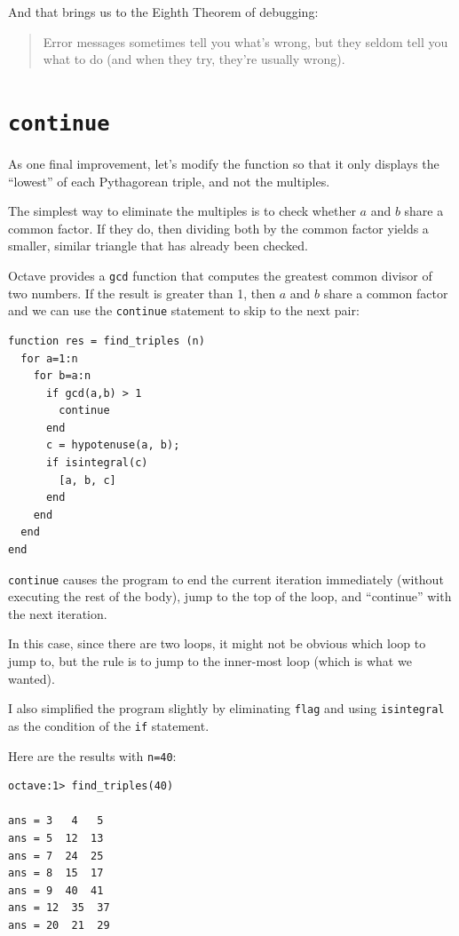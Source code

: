 \documentclass{book}
\begin{document}
And that brings us to the Eighth Theorem of debugging:

\begin{quote}
Error messages sometimes tell you what's wrong, but they
seldom tell you what to do (and when they try, they're usually
wrong).
\end{quote}


\section{{\tt continue}}

As one final improvement, let's modify the function so that it only
displays the ``lowest'' of each Pythagorean triple, and not the
multiples.

The simplest way to eliminate the multiples is to check whether
$a$ and $b$ share a common factor. If they do, then dividing both
by the common factor yields a smaller, similar triangle that has
already been checked.

Octave provides a {\tt gcd} function that computes the greatest common
divisor of two numbers. If the result is greater than 1, then
$a$ and $b$ share a common factor and we can use the {\tt continue}
statement to skip to the next pair:

\begin{verbatim}
function res = find_triples (n)
  for a=1:n
    for b=a:n
      if gcd(a,b) > 1
        continue
      end
      c = hypotenuse(a, b);
      if isintegral(c)
        [a, b, c]
      end
    end
  end
end
\end{verbatim}

{\tt continue} causes the program to end the current iteration
immediately (without executing the rest of the body), jump to
the top of the loop, and ``continue'' with the next iteration.

In this case, since there are two loops, it might not be obvious
which loop to jump to, but the rule is to jump to the inner-most
loop (which is what we wanted).

I also simplified the program slightly by eliminating
{\tt flag} and using {\tt isintegral} as the condition of the
{\tt if} statement.

Here are the results with {\tt n=40}:

\begin{verbatim}
octave:1> find_triples(40)

ans = 3   4   5
ans = 5  12  13
ans = 7  24  25
ans = 8  15  17
ans = 9  40  41
ans = 12  35  37
ans = 20  21  29
\end{verbatim}
\end{document}
